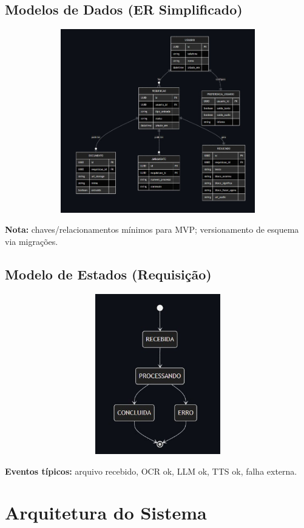 \documentclass{article}
\begin{document}
\newpage

\subsection{Modelos de Dados (ER Simplificado)}
\includegraphics[width=3\textwidth,height=8cm,keepaspectratio]{images/Modelo-de-Dados.jpg}

\textbf{Nota:} chaves/relacionamentos mínimos para MVP; versionamento de esquema via migrações.

\subsection{Modelo de Estados (Requisição)}
\includegraphics[width=3\textwidth,height=7cm,keepaspectratio]{images/Modelo-de-Estados.jpg}

\textbf{Eventos típicos:} arquivo recebido, OCR ok, LLM ok, TTS ok, falha externa.

\newpage

\section{Arquitetura do Sistema}
\end{document}
